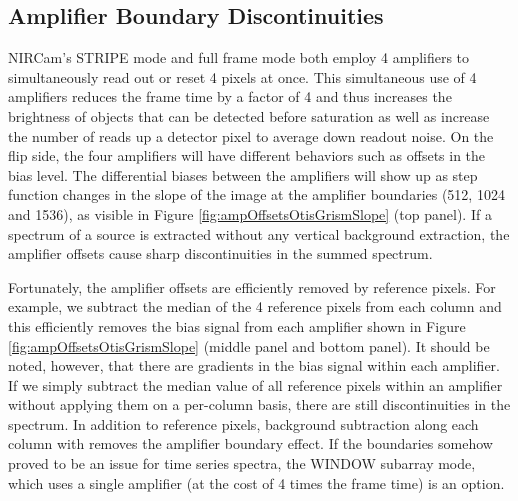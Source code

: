 \documentclass{aastex62}
\begin{document}
\subsection{Amplifier Boundary Discontinuities}

NIRCam's STRIPE mode and full frame mode both employ 4 amplifiers to simultaneously read out or reset 4 pixels at once.
This simultaneous use of 4 amplifiers reduces the frame time by a factor of 4 and thus increases the brightness of objects that can be detected before saturation as well as increase the number of reads up a detector pixel to average down readout noise.
On the flip side, the four amplifiers will have different behaviors such as offsets in the bias level.
The differential biases between the amplifiers will show up as step function changes in the slope of the image at the amplifier boundaries (512, 1024 and 1536), as visible in Figure \ref{fig:ampOffsetsOtisGrismSlope} (top panel).
If a spectrum of a source is extracted without any vertical background extraction, the amplifier offsets cause sharp discontinuities in the summed spectrum.

Fortunately, the amplifier offsets are efficiently removed by reference pixels.
For example, we subtract the median of the 4 reference pixels from each column and this efficiently removes the bias signal from each amplifier shown in Figure \ref{fig:ampOffsetsOtisGrismSlope} (middle panel and bottom panel).
It should be noted, however, that there are gradients in the bias signal within each amplifier. If we simply subtract the median value of all reference pixels within an amplifier without applying them on a per-column basis, there are still discontinuities in the spectrum.
In addition to reference pixels, background subtraction along each column with removes the amplifier boundary effect.
If the boundaries somehow proved to be an issue for time series spectra, the WINDOW subarray mode, which uses a single amplifier (at the cost of 4 times the frame time) is an option.
\end{document}
